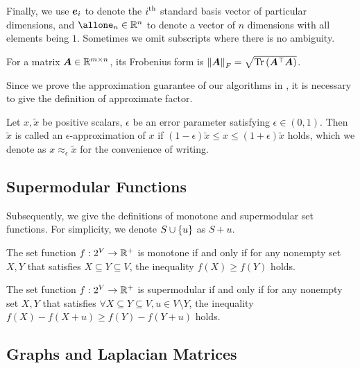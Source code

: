\documentclass[sigconf]{acmart}
\begin{document}
Finally, we use \(\boldsymbol{e}_i\) to denote the \({i}^{\rm{th}}\) standard basis vector of particular dimensions, and \(\allone_n\in \rea^n\) to denote a vector of \(n\) dimensions with all elements being \(1\).
Sometimes we omit subscripts where there is no ambiguity.

For a matrix \(\boldsymbol{A}\in\mathbb{R}^{m\times n}\), its Frobenius form is \(\left\Vert\boldsymbol{A}\right\Vert_F=\sqrt{\mathrm{Tr}\left(\boldsymbol{A}^\top\boldsymbol{A}\right)}\).

Since we prove the approximation guarantee of our algorithms in , it is necessary to give the definition of approximate factor.

\begin{definition}
    Let \(x,\tilde{x}\) be positive scalars, \(\epsilon\) be an error parameter satisfying \(\epsilon\in(0,1)\).
    Then \(\tilde{x}\) is called an \(\epsilon\)-approximation of \(x\) if \((1-\epsilon)\tilde{x}\le x\le(1+\epsilon)\tilde{x}\) holds, which we denote as \(x\approx_{\epsilon}\tilde{x}\) for the convenience of writing.
\end{definition}

\subsection{Supermodular Functions}

Subsequently, we give the definitions of monotone and supermodular set functions. For simplicity, we denote \(S\cup\left\{u \right\}\) as \(S+u\).

\begin{definition}[Monotonicity]
    The set function \(f:2^{V}\to\mathbb{R}^+\) is monotone if and only if for any nonempty set \(X,Y\) that satisfies \(X\subseteq Y\subseteq V\), the inequality \(f(X)\ge f(Y)\) holds.
\end{definition}

\begin{definition}[Supermodularity]
    The set function \(f:2^{V}\to\mathbb{R}^+\) is supermodular if and only if for any nonempty set \(X,Y\) that satisfies \(\forall X\subseteq Y\subseteq V, u\in V\setminus Y\), the inequality \(f(X)-f(X+u)\ge f(Y)-f(Y+u)\) holds.
\end{definition}

\subsection{Graphs and Laplacian Matrices}\label{sub:lap}
\end{document}
